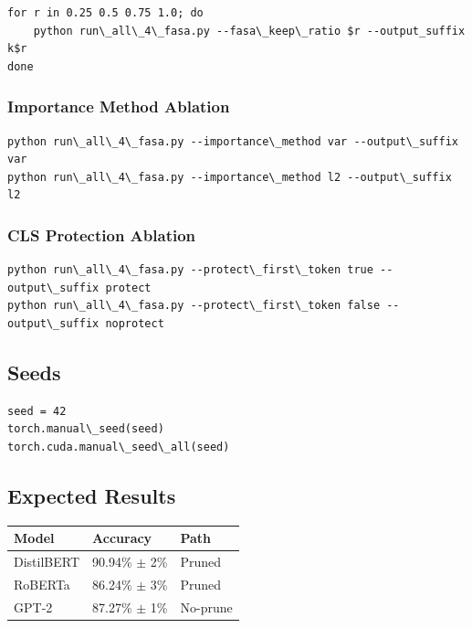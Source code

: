 \begin{lstlisting}
for r in 0.25 0.5 0.75 1.0; do
    python run\_all\_4\_fasa.py --fasa\_keep\_ratio $r --output_suffix k$r
done
\end{lstlisting}

\subsubsection{Importance Method Ablation}

\begin{lstlisting}
python run\_all\_4\_fasa.py --importance\_method var --output\_suffix var
python run\_all\_4\_fasa.py --importance\_method l2 --output\_suffix l2
\end{lstlisting}

\subsubsection{CLS Protection Ablation}

\begin{lstlisting}
python run\_all\_4\_fasa.py --protect\_first\_token true --output\_suffix protect
python run\_all\_4\_fasa.py --protect\_first\_token false --output\_suffix noprotect
\end{lstlisting}

\subsection{Seeds}

\begin{lstlisting}
seed = 42
torch.manual\_seed(seed)
torch.cuda.manual\_seed\_all(seed)
\end{lstlisting}

\subsection{Expected Results}

\begin{table}[H]
\centering
\small
\begin{tabular}{lll}
\toprule
\textbf{Model} & \textbf{Accuracy} & \textbf{Path} \\
\midrule
DistilBERT & 90.94\% $\pm$ 2\% & Pruned \\
RoBERTa & 86.24\% $\pm$ 3\% & Pruned \\
GPT-2 & 87.27\% $\pm$ 1\% & No-prune \\
\bottomrule
\end{tabular}
\end{table}

